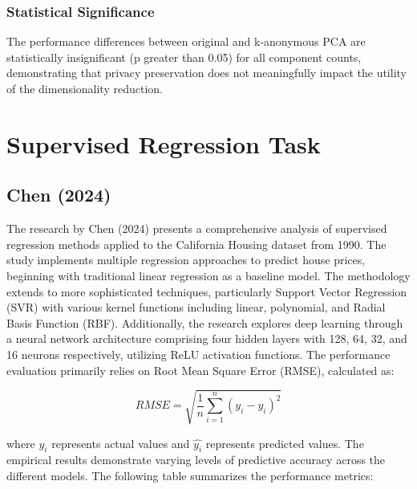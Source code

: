 \documentclass[a4paper, 11pt]{article}
\begin{document}
\subsubsection{Statistical Significance}
The performance differences between original and k-anonymous PCA are statistically insignificant (p greater than 0.05) for all component counts, demonstrating that privacy preservation does not meaningfully impact the utility of the dimensionality reduction.

\section{Supervised Regression Task}
\subsection{Chen (2024)}
The research by Chen (2024) presents a comprehensive analysis of supervised regression methods applied to the California Housing dataset from 1990. The study implements multiple regression approaches to predict house prices, beginning with traditional linear regression as a baseline model. The methodology extends to more sophisticated techniques, particularly Support Vector Regression (SVR) with various kernel functions including linear, polynomial, and Radial Basis Function (RBF). Additionally, the research explores deep learning through a neural network architecture comprising four hidden layers with 128, 64, 32, and 16 neurons respectively, utilizing ReLU activation functions.
The performance evaluation primarily relies on Root Mean Square Error (RMSE), calculated as:

\[ RMSE = \sqrt{\frac{1}{n}\sum_{i=1}^{n}(y_i - \hat{y_i})^2} \]

where $y_i$ represents actual values and $\hat{y_i}$ represents predicted values.
The empirical results demonstrate varying levels of predictive accuracy across the different models. The following table summarizes the performance metrics:
\end{document}
